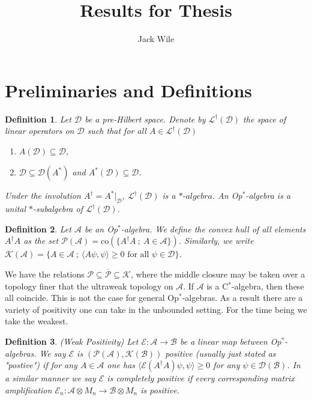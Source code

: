 \documentclass[12pt]{article}
\title{Results for Thesis}
\author{Jack Wile}
\date{}
\newtheorem*{definition}{Definition}
\newcommand\mc{\mathcal}
\newcommand\ms{\mathscr}
\newcommand{\ldag}[1]{\mathscr{L}^\dagger(\mathscr{#1})}
\newcommand{\ip}[2]{\langle #1, #2 \rangle}
\begin{document}
\section*{Preliminaries and Definitions}

\begin{definition}
	Let $\mathscr{D}$ be a pre-Hilbert space. Denote by $\mathscr{L}^\dagger(\mathscr{D})$
	the space of linear operators on $\ms{D}$ such that for all $A \in \ldag{D}$ 

	\begin{enumerate}
		\item $A(\ms{D}) \subseteq \ms{D}$,
		\item $\ms{D} \subseteq \mc{D}(A^*)$ and $A^*(\ms{D}) \subseteq \ms{D}$.
	\end{enumerate}

	\noindent Under the involution $A^\dagger = A^*|_{\ms{D}}$, $\ldag{D}$ is a $*\text{-}algebra$. 
	An Op$^*$-algebra is a unital $*$-subalgebra of $\ldag{D}$.
\end{definition}

\begin{definition}
	Let $\ms{A}$ be an Op$^*$-algebra. We define the convex hull of all elements $A^\dagger A$ as the set
	$\mc{P}(\ms{A}) = \text{co}(\{A^\dagger A \ ; \ A \in \ms{A}\})$. Similarly, we write
	$\mc{K}(\ms{A}) = \{A \in \ms{A} \ ; \ \ip{A\psi}{\psi} \ge 0 \text{ for all } \psi \in \ms{D}\}$.


\end{definition}

We have the relations $\mc{P} \subseteq \overline{\mc{P}} \subseteq \mc{K}$, where the middle closure may be taken over a
topology finer that the ultraweak topology on $\ms{A}$. If $\ms{A}$ is a C$^*$-algebra, then these all coincide. This is not 
the case for general Op$^*$-algebras. As a result there are a variety of positivity one can take in the unbounded setting. 
For the time being we take the weakest.


\begin{definition} (Weak Positivity) Let $\mc{E}: \ms{A} \to \ms{B}$ be a linear map between Op$^*$-algebras. 
	We say $\mc{E}$ is $(\mc{P}(\ms{A}), \mc{K}(\ms{B}))$ positive (usually just stated as "postive")
	if for any $A \in \ms{A}$ one has 
	$\ip{\mc{E}(A^\dagger A)\psi}{\psi} \ge 0$ for any $\psi \in \mc{D}(\ms{B})$. In a similar manner 
	we say $\mc{E}$ is completely positive if every corresponding matrix amplification
	$\mc{E}_n:\ms{A} \otimes M_n \to \ms{B} \otimes M_n$ is positive. 
\end{definition}
\end{document}
